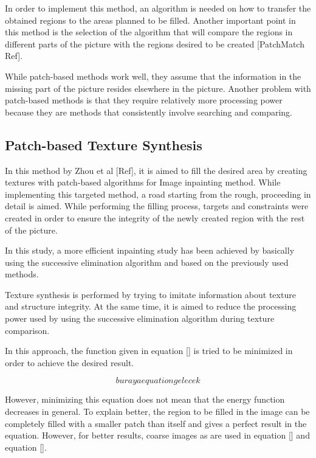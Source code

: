 In order to implement this method, an algorithm is needed on how to transfer the obtained regions to the areas planned to be filled. Another important point in this method is the selection of the algorithm that will compare the regions in different parts of the picture with the regions desired to be created [PatchMatch Ref].

While patch-based methods work well, they assume that the information in the missing part of the picture resides elsewhere in the picture. Another problem with patch-based methods is that they require relatively more processing power because they are methods that consistently involve searching and comparing.

\subsection{Patch-based Texture Synthesis}

In this method by Zhou et al [Ref], it is aimed to fill the desired area by creating textures with patch-based algorithms for Image inpainting method. While implementing this targeted method, a road starting from the rough, proceeding in detail is aimed. While performing the filling process, targets and constraints were created in order to ensure the integrity of the newly created region with the rest of the picture.

In this study, a more efficient inpainting study has been achieved by basically using the successive elimination algorithm and based on the previously used methods.

Texture synthesis is performed by trying to imitate information about texture and structure integrity. At the same time, it is aimed to reduce the processing power used by using the successive elimination algorithm during texture comparison.

In this approach, the function given in equation [] is tried to be minimized in order to achieve the desired result.

\begin{equation}
    buraya equation gelecek
\end{equation}

However, minimizing this equation does not mean that the energy function decreases in general. To explain better, the region to be filled in the image can be completely filled with a smaller patch than itself and gives a perfect result in the equation. However, for better results, coarse images as  are used in equation [] and equation [].

